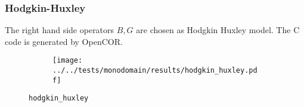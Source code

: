 %
%
\begin{frame}
  \frametitle{Hodgkin-Huxley}
  The right hand side operators $B,G$ are chosen as Hodgkin Huxley model. The C code is generated by OpenCOR.
  \vspace*{-0.2cm}
  \begin{figure}[h!]
    \begin{subfigure}[t]{0.5\textwidth}%
    \centering
    \end{subfigure}
    \begin{subfigure}[t]{0.48\textwidth}%
      \centering%
      \texttt{[image: ../../tests/monodomain/results/hodgkin\_huxley.pdf]}%
    \end{subfigure}%
    \caption{\lstinline{hodgkin_huxley}}
  \end{figure} 
\end{frame}
%
